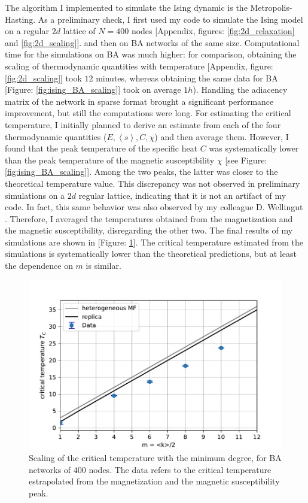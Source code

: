 The algorithm I implemented to simulate the Ising dynamic is the Metropolis-Hasting. As a preliminary check, I first used my code to simulate the Ising model on a regular $2d$ lattice of $N =400$ nodes [Appendix, figures: \ref{fig:2d_relaxation} and \ref{fig:2d_scaling}]. and then on BA networks of the same size.
Computational time for the simulations on BA was much higher: for comparison, obtaining the scaling of thermodynamic quantities with temperature [Appendix, figure: \ref{fig:2d_scaling}] took $12$ minutes, whereas obtaining the same data for BA [Figure: \ref{fig:ising_BA_scaling}] took on average $1h$). Handling the adiacency matrix of the network in sparse format brought a significant performance improvement, but still the computations were long. \medskip \newline \noindent
For estimating the critical temperature, I initially planned to derive an estimate from each of the four thermodynamic quantities ($E, \left\langle s \right\rangle, C, \chi$) and then average them. However, I found that the peak temperature of the specific heat $C$ was systematically lower than the peak temperature of the magnetic susceptibility $\chi$ [see Figure: \ref{fig:ising_BA_scaling}]. Among the two peaks, the latter was closer to the theoretical temperature value. This discrepancy was not observed in preliminary simulations on a $2d$ regular lattice, indicating that it is not an artifact of my code. In fact, this same behavior was also observed by my colleague D. Wellingut \cite{dw}. Therefore, I averaged the temperatures obtained from the magnetization and the magnetic susceptibility, disregarding the other two. The final results of my simulations are shown in [Figure: \ref{fig:final_ising}]. The critical temperature estimated from the simulations is systematically lower than the theoretical predictions, but at least the dependence on $m$ is similar.
\begin{figure}[H]
    \centering
    \includegraphics[width=0.7\linewidth]{latex_source/images/ising/BA_temperatures.pdf}
    \caption{Scaling of the critical temperature with the minimum degree, for BA networks of $400$ nodes. The data refers to the critical temperature estrapolated from the magnetization and the magnetic susceptibility peak.}
    \label{fig:final_ising}
\end{figure}

